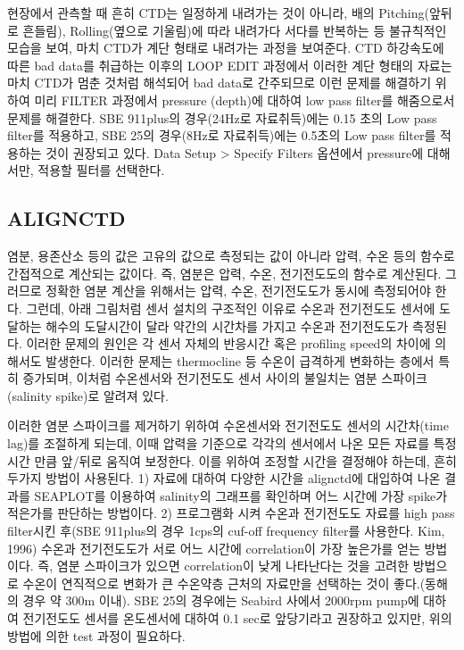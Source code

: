 \documentclass[
]{book}
\begin{document}
현장에서 관측할 때 흔히 CTD는 일정하게 내려가는 것이 아니라, 배의 Pitching(앞뒤로 흔들림), Rolling(옆으로 기울림)에 따라 내려가다 서다를 반복하는 등 불규칙적인 모습을 보여, 마치 CTD가 계단 형태로 내려가는 과정을 보여준다.
CTD 하강속도에 따른 bad data를 취급하는 이후의 LOOP EDIT 과정에서 이러한 계단 형태의 자료는 마치 CTD가 멈춘 것처럼 해석되어 bad data로 간주되므로 이런 문제를 해결하기 위하여 미리 FILTER 과정에서 pressure (depth)에 대하여 low pass filter를 해줌으로서 문제를 해결한다.
SBE 911plus의 경우(24Hz로 자료취득)에는 0.15 초의 Low pass filter를 적용하고, SBE 25의 경우(8Hz로 자료취득)에는 0.5초의 Low pass filter를 적용하는 것이 권장되고 있다.
Data Setup \textgreater{} Specify Filters 옵션에서 pressure에 대해서만, 적용할 필터를 선택한다.

\hypertarget{alignctd}{%
\subsection{ALIGNCTD}\label{alignctd}}

염분, 용존산소 등의 값은 고유의 값으로 측정되는 값이 아니라 압력, 수온 등의 함수로 간접적으로 계산되는 값이다. 즉, 염분은 압력, 수온, 전기전도도의 함수로 계산된다. 그러므로 정확한 염분 계산을 위해서는 압력, 수온, 전기전도도가 동시에 측정되어야 한다. 그런데, 아래 그림처럼 센서 설치의 구조적인 이유로 수온과 전기전도도 센서에 도달하는 해수의 도달시간이 달라 약간의 시간차를 가지고 수온과 전기전도도가 측정된다. 이러한 문제의 원인은 각 센서 자체의 반응시간 혹은 profiling speed의 차이에 의해서도 발생한다. 이러한 문제는 thermocline 등 수온이 급격하게 변화하는 층에서 특히 증가되며, 이처럼 수온센서와 전기전도도 센서 사이의 불일치는 염분 스파이크(salinity spike)로 알려져 있다.

이러한 염분 스파이크를 제거하기 위하여 수온센서와 전기전도도 센서의 시간차(time lag)를 조절하게 되는데, 이때 압력을 기준으로 각각의 센서에서 나온 모든 자료를 특정시간 만큼 앞/뒤로 움직여 보정한다.
이를 위하여 조정할 시간을 결정해야 하는데, 흔히 두가지 방법이 사용된다. 1) 자료에 대하여 다양한 시간을 alignctd에 대입하여 나온 결과를 SEAPLOT를 이용하여 salinity의 그래프를 확인하며 어느 시간에 가장 spike가 적은가를 판단하는 방법이다. 2) 프로그램화 시켜 수온과 전기전도도 자료를 high pass filter시킨 후(SBE 911plus의 경우 1cps의 cuf-off frequency filter를 사용한다. Kim, 1996) 수온과 전기전도도가 서로 어느 시간에 correlation이 가장 높은가를 얻는 방법이다. 즉, 염분 스파이크가 있으면 correlation이 낮게 나타난다는 것을 고려한 방법으로 수온이 연직적으로 변화가 큰 수온약층 근처의 자료만을 선택하는 것이 좋다.(동해의 경우 약 300m 이내).
SBE 25의 경우에는 Seabird 사에서 2000rpm pump에 대하여 전기전도도 센서를 온도센서에 대하여 0.1 sec로 앞당기라고 권장하고 있지만, 위의 방법에 의한 test 과정이 필요하다.
\end{document}
